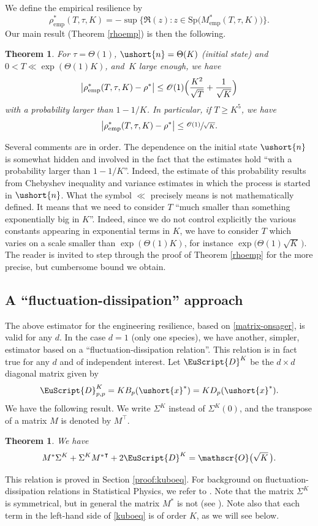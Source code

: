 \documentclass[JEP,XML,SOM,Unicode]{cedram}
\newcommand{\emp}{\mathrm{emp}}
\let\mathcal\mathscr
\numberwithin{equation}{section}
\theoremstyle{plain}
\newtheorem{theorem}{Theorem}[section]
\newtheorem*{theorem*}{Theorem}
\theoremstyle{definition}
\newcommand{\Oun}{\mathcal{O}(1)}
\newcommand{\Thetaun}{\Theta(1)}
\newcommand{\sK}{K}
\newcommand{\Sp}{\mathrm{Sp}}
\newcommand{\vecn}{\ushort{n}}
\newcommand{\vecxf}{\ushort{x}^*}
\newcommand{\res}{\rho^*}
\begin{document}
We define the empirical resilience by
\[
\rho^*_\emp(T,\tau,K)=
- \sup\big\{ \Re (z): z\in\Sp\bigl(M^{*}_\emp(T,\tau,K)\bigr)\big\}.
\]
Our main result (Theorem \ref{rhoemp}) is then the following.
\begin{theorem*}
For $\tau=\Theta(1)$, $\vecn=\Theta(K)$ (initial state) and $0<T\ll \exp(\Thetaun K)$,
and~$K$ large enough, we have
\[
\big|\rho^*_\emp(T,\tau,K)-\res\big|\le
\Oun \Bigl(\frac{K^2}{\sqrt{T}} +\frac{1}{\sqrt{K}}\Bigr)
\]
with a probability larger than $1-1/K$. In particular, if $T\geq K^5$, we have
\[
\big|\rho^*_\emp(T,\tau,K)-\res\big|\leq \sfrac{\Oun}{\sqrt{K}}.
\]
\end{theorem*}
Several comments are in order.
The dependence on the initial state $\vecn$ is somewhat hidden and involved in the fact that the estimates hold ``with a probability larger than $1-1/K$''.
Indeed, the estimate of this probability results from Chebyshev inequality and variance estimates in which the process is started in
$\vecn$.
What the symbol $\ll$ precisely means is not mathematically defined. It means that we need to consider $T$ ``much smaller than
something exponentially big in $K$''. Indeed, since we do not control explicitly the various constants appearing in exponential terms in $K$, we have to
consider $T$ which varies on a scale smaller than $\exp(\Theta(1)K)$, for instance $\exp\bigl(\Theta(1)\sqrt{K}\,\bigr)$. The
reader is invited to step through the proof of Theorem \ref{rhoemp} for the more precise, but cumbersome bound we obtain.

\subsection{A ``fluctuation-dissipation'' approach}

The above estimator for the engineering resilience, based on \eqref{matrix-onsager}, is valid for any $d$.
In the case $d=1$ (only one species), we have another, simpler, estimator based on a ``fluctuation-dissipation relation''.
This relation is in fact true for any $d$ and of independent interest.
Let $\EuScript{D}^{\sK}$ be the $d\times d$ diagonal matrix given by
\[
\EuScript{D}^{\sK}_{p,p}=K B_{p}(\vecxf)=K D_{p}(\vecxf).
\]
We have the following result. We write $\Sigma^{\sK}$ instead of $\Sigma^{\sK}(0)$, and the transpose of a matrix $M$ is denoted
by $M^{\intercal}$.
\begin{theorem}\label{thm-Kubo}
We have
\begin{equation}\label{kuboeq}
M^*\Sigma^{\sK}+\Sigma^{\sK}{M^*}^{\intercal}+2\EuScript{D}^{\sK}=\mathcal{O}\bigl(\sqrt{K}\,\bigr).
\end{equation}
\end{theorem}
This relation is proved in Section \ref{proof:kuboeq}. For background on fluctuation-dissipation relations in Statistical
Physics, we refer to \cite[\S\S 2-3]{kubo}. Note that the matrix $\Sigma^{\sK}$ is symmetrical, but in general the matrix
$M^*$ is not (see
\cite{ccm2}). Note also that each term in the left-hand side of \eqref{kuboeq} is of order $K$, as we will see below.
\end{document}
